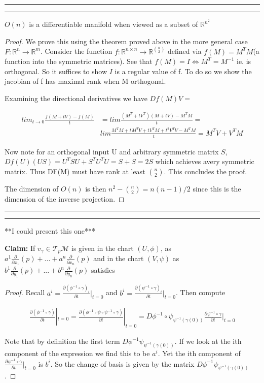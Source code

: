 \documentclass[11pt]{article}
\newcommand{\R}{\mathbb{R}}
\newcommand{\m}{\mathcal{M}}
\newcommand{\Tt}{\mathcal{T}}
\newcommand{\pa}{\partial}
\newcommand{\question}[2] {\vspace{.25in} \hrule\vspace{0.5em}
\noindent{\bf #1: #2} \vspace{0.5em}
\hrule \vspace{.10in}}
\begin{document}
\question{Question 2}


\textbf{Claim:} $O(n)$ is a differentiable manifold when viewed as a subset of $\R^{n^2}$

\begin{proof}

We prove this using the theorem proved above in the more general case $F : \R^n \to \R^m$. Consider the function $f : \R^{n\times n} \to \R^{{n \choose 2}}$ defined via $f(M) = M^TM$(a function into the symmetric matrices). See that $f(M) = I \iff M^T = M^{-1}$ ie. is orthogonal. So it suffices to show $I$ is a regular value of f. To do so we show the jacobian of f has maximal rank when M orthogonal.

Examining the directional derivatives we have $Df(M) V = $

\begin{align*}
	lim_{t \to 0} \frac{f(M+tV)-f(M)}{t} &= lim \frac{(M^T+tV^T)(M+tV)-M^TM}{t} =\\
	& lim \frac{M^TM + tM^TV+tV^TM + t^2V^TV - M^TM}{t} = M^TV + V^TM
\end{align*}

Now note for an orthogonal input U and arbitrary symmetric matrix $S$, $Df(U)(US) = U^TSU + S^TU^TU = S + S = 2 S$ which achieves avery symmetric matrix. Thus DF(M) must have rank at least ${n \choose 2}$. This concludes the proof.

The dimension of $O(n)$ is then $n^2 - {n \choose 2} = n(n-1)/2$ since this is the dimension of the inverse projection.

\end{proof}


\question{Question 3}


***I could present this one***

\textbf{Claim:} If $v_{\gamma} \in \Tt_p \m$ is given in the chart $(U,\phi)$, as $a^1 \frac{\partial}{\partial x_1}(p) + ... + a^n\frac{\partial}{\partial x_n}(p)$ and in the chart $(V,\psi)$ as $b^1 \frac{\partial}{\partial y_1}(p) + ... + b^n\frac{\partial}{\partial y_n}(p)$ satisfies

\begin{proof}
	Recall $a^i = \frac{\pa(\phi^{-1}\circ \gamma)_i}{\pa t}|_{t=0}$ and $b^i = \frac{\pa (\psi^{-1}\circ \gamma)_i}{\pa t}|_{t=0}$. Then compute

	\begin{align*}
		\frac{\pa (\phi^{-1}\circ \gamma)}{\pa t}|_{t=0} = \frac{\pa (\phi^{-1}\circ \psi \circ \psi^{-1} \circ \gamma)}{\pa t}|_{t=0} = D \phi^{-1}\circ \psi_{\psi^{-1}(\gamma(0))} \frac{\pa \psi^{-1} \circ \gamma}{\pa t}|_{t=0}
	\end{align*}

	Note that by definition the first term $D \phi^{-1}\psi_{\psi^{-1}(\gamma(0))}$. If we look at the ith component of the expression we find this to be $a^i$. Yet the ith component of $\frac{\pa \psi^{-1} \circ \gamma}{\pa t}|_{t=0}$ is $b^i$. So the change of basis is given by the matrix $D \phi^{-1}\psi_{\psi^{-1}(\gamma(0))}$. 
\end{proof}
\end{document}
